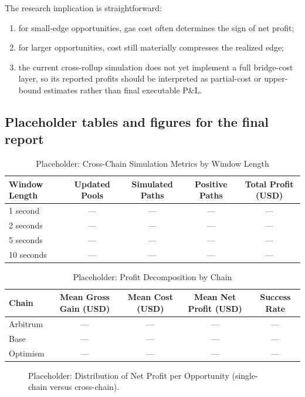 \documentclass[11pt]{article}
\begin{document}
The research implication is straightforward:
\begin{enumerate}[label=\arabic*.]
    \item for small-edge opportunities, gas cost often determines the sign of net profit;
    \item for larger opportunities, cost still materially compresses the realized edge;
    \item the current cross-rollup simulation does not yet implement a full bridge-cost layer, so its reported profits should be interpreted as partial-cost or upper-bound estimates rather than final executable P\&L.
\end{enumerate}

\subsection{Placeholder tables and figures for the final report}

\begin{table}[H]
\centering
\caption{Placeholder: Cross-Chain Simulation Metrics by Window Length}
\label{tab:window_metrics}
\begin{tabular}{lcccc}
\toprule
Window Length & Updated Pools & Simulated Paths & Positive Paths & Total Profit (USD) \\
\midrule
1 second & --- & --- & --- & --- \\
2 seconds & --- & --- & --- & --- \\
5 seconds & --- & --- & --- & --- \\
10 seconds & --- & --- & --- & --- \\
\bottomrule
\end{tabular}
\end{table}

\begin{table}[H]
\centering
\caption{Placeholder: Profit Decomposition by Chain}
\label{tab:profit_decomp}
\begin{tabular}{lcccc}
\toprule
Chain & Mean Gross Gain (USD) & Mean Cost (USD) & Mean Net Profit (USD) & Success Rate \\
\midrule
Arbitrum & --- & --- & --- & --- \\
Base & --- & --- & --- & --- \\
Optimism & --- & --- & --- & --- \\
\bottomrule
\end{tabular}
\end{table}

\begin{figure}[H]
\centering
\fbox{\rule{0pt}{2.2in}\rule{0.9\linewidth}{0pt}}
\caption{Placeholder: Distribution of Net Profit per Opportunity (single-chain versus cross-chain).}
\label{fig:profit_hist}
\end{figure}
\end{document}
